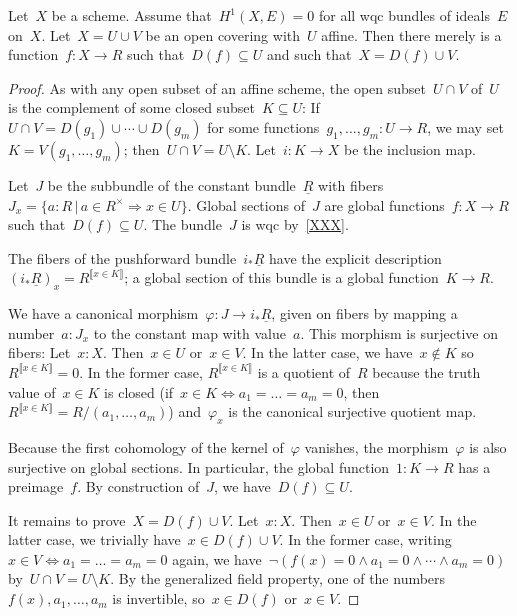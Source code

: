 
\begin{lemma}\label{serre-workhorse}
  Let~$X$ be a scheme. Assume that~$H^1(X, E) = 0$ for all wqc bundles of ideals~$E$
  on~$X$. Let~$X = U \cup V$ be an open covering with~$U$ affine. Then there
  merely is a function~$f : X \to R$ such that~$D(f) \subseteq U$ and such
  that~$X = D(f) \cup V$.
\end{lemma}

\begin{proof}
  As with any open subset of an affine scheme, the open subset~$U \cap V$
  of~$U$ is the complement of some closed subset~$K \subseteq U$:
  If~$U \cap V = D(g_1) \cup \cdots \cup D(g_m)$ for some
  functions~$g_1,\ldots,g_m : U \to R$, we may set~$K = V(g_1,\ldots,g_m)$;
  then~$U \cap V = U \setminus K$. Let~$i : K \to X$ be the inclusion map.

  Let~$J$ be the subbundle of the constant bundle~$\underline{R}$ with
  fibers~$J_x = \{ a : R \,|\, a \in R^\times \Rightarrow x \in U \}$.
  Global sections of~$J$ are global functions~$f : X \to R$ such that~$D(f)
  \subseteq U$. The bundle~$J$ is wqc by~\cref{XXX}.

  The fibers of the pushforward bundle~$i_*\underline{R}$ have the explicit
  description~$(i_*\underline{R})_x = R^{\llbracket x \in K \rrbracket}$; a
  global section of this bundle is a global function~$K \to R$.

  We have a canonical morphism~$\varphi : J \to i_*\underline{R}$, given on
  fibers by mapping a number~$a : J_x$ to the constant map with value~$a$. This
  morphism is surjective on fibers: Let~$x : X$. Then~$x \in U$ or~$x \in V$.
  In the latter case, we have~$x \not\in K$ so~$R^{\llbracket x \in K
  \rrbracket} = 0$. In the former case, $R^{\llbracket x \in K \rrbracket}$ is
  a quotient of~$R$ because the truth value of~$x \in K$ is closed (if~$x \in K
  \Leftrightarrow a_1 = \ldots = a_m = 0$, then~$R^{\llbracket x \in K
  \rrbracket} = R/(a_1,\ldots,a_m)$) and~$\varphi_x$ is the canonical
  surjective quotient map.

  Because the first cohomology of the kernel of~$\varphi$ vanishes, the
  morphism~$\varphi$ is also surjective on global sections. In particular, the
  global function~$1 : K \to R$ has a preimage~$f$. By construction of~$J$,
  we have~$D(f) \subseteq U$.

  It remains to prove~$X = D(f) \cup V$. Let~$x : X$. Then~$x \in U$ or~$x \in V$.
  In the latter case, we trivially have~$x \in D(f) \cup V$. In the former
  case, writing~$x \in V \Leftrightarrow a_1 = \ldots = a_m = 0$ again,
  we have~$\neg(f(x) = 0 \wedge a_1 = 0 \wedge \cdots \wedge a_m = 0)$ by~$U
  \cap V = U \setminus K$. By the generalized field property, one of the
  numbers~$f(x), a_1, \ldots, a_m$ is invertible, so~$x \in D(f)$ or~$x \in V$.
\end{proof}

